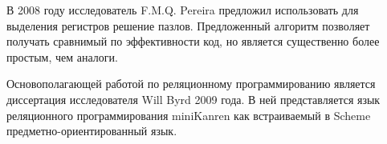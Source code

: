 В 2008 году исследователь F.M.Q. Pereira предложил использовать для выделения регистров решение пазлов. Предложенный алгоритм позволяет получать сравнимый по эффективности код, но является существенно более простым, чем аналоги.

Основополагающей работой по реляционному программированию является диссертация исследователя Will Byrd 2009 года. В ней представляется язык реляционного программирования miniKanren как встраиваемый в Scheme предметно-ориентированный язык.
%


